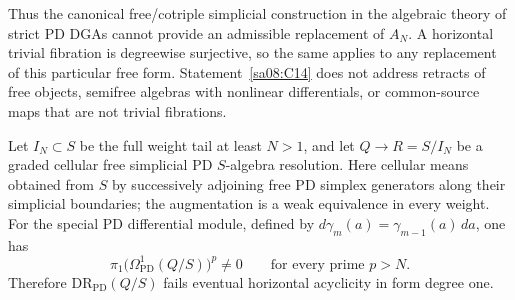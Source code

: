 Thus the canonical free/cotriple simplicial construction
in the algebraic theory of strict PD DGAs cannot provide
an admissible replacement of $A_N$. A horizontal trivial
fibration is degreewise surjective, so the same applies
to any replacement of this particular free form.
Statement~\ref{sa08:C14} does not address retracts of free
objects, semifree algebras with nonlinear differentials,
or common-source maps that are not trivial fibrations.

\begin{proposition}
\label{sa08:C15}
Let $I_N\subset S$ be the full weight tail at least $N>1$,
and let $Q\to R=S/I_N$ be a graded cellular free simplicial
PD $S$-algebra resolution. Here cellular means obtained
from $S$ by successively adjoining free PD simplex
generators along their simplicial boundaries; the
augmentation is a weak equivalence in every weight.
For the special PD differential module,
defined by $d\gamma_m(a)=\gamma_{m-1}(a)\,da$, one has
\[
 \pi_1\bigl(\Omega^1_{\mathrm{PD}}(Q/S)\bigr)^p\ne0
 \qquad\text{for every prime }p>N.
\]
Therefore $\mathrm{DR}_{\mathrm{PD}}(Q/S)$ fails eventual
horizontal acyclicity in form degree one.
\end{proposition}
